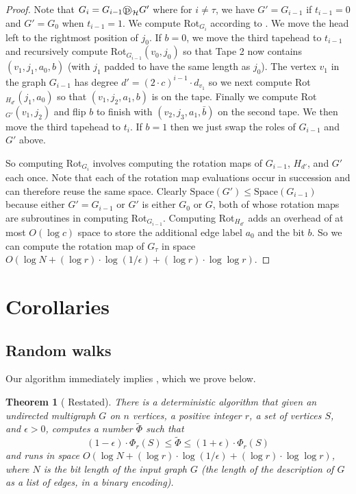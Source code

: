 \documentclass{toc}
\newcommand{\wt}{\widetilde}   %
\newcommand{\SC}{O(\log N + (\log r)\cdot\log(1/\epsilon)+(\log r)\cdot \log\log r)}
\newcommand{\dpr}{\text{\textcircled{p}}_{\mathcal{H}}}
\newcommand{\Space}{\mathrm{Space}}
\numberwithin{myalgctr}{section}
\theoremstyle{named}
\newtheorem{namedtheorem}{Theorem}[section]
\begin{document}
\begin{proof}
Note that $G_i=G_{i-1}\dpr G'$ where for $i\neq \tau$, we have $G'=G_{i-1}$ if $t_{i-1}=0$ and $G'=G_{0}$ when $t_{i-1}=1$. We compute Rot$_{G_i}$ according to . We move the head left to the rightmost position of $j_0$. If $b=0$, we move the third tapehead to $t_{i-1}$ and recursively compute Rot$_{G_{i-1}}(v_0,j_0)$ so that Tape 2 now contains $(v_1,j_1,a_0, b)$ (with $j_1$ padded to have the same length as $j_0$). The vertex $v_1$ in the graph $G_{i-1}$ has degree $d'=(2\cdot c)^{i-1}\cdot d_{v_1}$ so we next compute Rot$_{H_{d'}}(j_1,a_0)$ so that $(v_1, j_2, a_1, b)$ is on the tape. Finally we compute Rot$_{G'}(v_1,j_2)$ and flip $b$ to finish with $(v_2,j_3,a_1, \bar{b})$ on the second tape. We then move the third tapehead to $t_i$. If $b=1$ then we just swap the roles of $G_{i-1}$ and $G'$ above.  

So computing Rot$_{G_i}$ involves computing the rotation maps of $G_{i-1}$, $H_{d'}$, and $G'$ each once. Note that each of the rotation map evaluations occur in succession and can therefore reuse the same space. Clearly $\Space(G')\leq \Space(G_{i-1})$ because either $G'=G_{i-1}$ or $G'$ is either $G_0$ or $G$, both of whose rotation maps are subroutines in computing Rot$_{G_{i-1}}$. Computing Rot$_{H_{d'}}$ adds an overhead of at most $O(\log c)$ space to store the additional edge label $a_0$ and the bit $b$. So we can compute the rotation map of $G_\tau$ in space $\SC$. 
\end{proof}

\section{Corollaries}
\label{sect:cors}
%
\subsection{Random walks}
Our algorithm immediately implies , which we prove below. 

\begin{namedtheorem}[ Restated]
There is a deterministic algorithm that given an undirected multigraph $G$ on $n$ vertices, a positive integer $r$, a set of vertices $S$, and $\epsilon>0$, computes a number $\wt{\Phi}$ such that
\[
(1-\epsilon)\cdot \Phi_r(S) \leq \wt{\Phi} \leq (1+\epsilon)\cdot \Phi_r(S)
\]
and runs in space $\SC$, where $N$ is the bit length of the input graph $G$ (the length of the description of $G$ as a list of edges, in a binary encoding). 
\end{namedtheorem}
\end{document}
